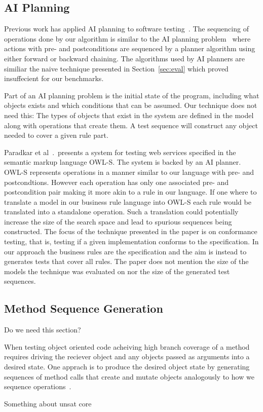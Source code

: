 \subsection{AI Planning}

Previous work has applied AI planning to software
testing~\cite{Scheetz99ai,Howe97testcase}. The sequencing of
operations done by our algorithm is similar to the AI planning
problem~\cite{Weld94} where actions with pre- and postconditions are sequenced
by a planner algorithm using either forward or backward chaining. The
algorithms used by AI planners are similiar the naive technique
presented in Section~\ref{sec:eval} which proved insuffecient for our
benchmarks. 

Part of an AI planning problem is the initial state of the program,
including what objects exists and which conditions that can be
assumed. Our technique does not need this: The types of objects that
exist in the system are defined in the model along with operations
that create them. A test sequence will construct any object needed to
cover a given rule part.

Paradkar et al~\cite{conf/icws/ParadkarSWJOSL07}.\ presents a system
for testing web services specified in the semantic markup language
OWL-S. The system is backed by an AI planner. OWL-S represents
operations in a manner similar to our language with pre- and
postcondtions. However each operation has only one associated pre- and
postcondition pair making it more akin to a rule in our language. If
one where to translate a model in our business rule language into
OWL-S each rule would be translated into a standalone operation. Such
a translation could potentially increase the size of the search space
and lead to spurious sequences being constructed. The focus of the
technique presented in the paper is on conformance testing, that is,
testing if a given implementation conforms to the specification. In
our approach the business rules are the specification and the aim is
instead to generates tests that cover all rules. The paper does not
mention the size of the models the technique was evaluated on nor the
size of the generated test sequences.

\subsection{Method Sequence Generation}

Do we need this section?

When testing object oriented code acheiving high branch coverage of a
method requires driving the reciever object and any objects passed as
arguments into a desired state. One apprach is to produce the desired
object state by generating sequences of method calls that create and
mutate objects analogously to how we sequence
operations~\cite{pacheco2007,tillmann2008,thummalapenta2011}.  

Something about unsat core
